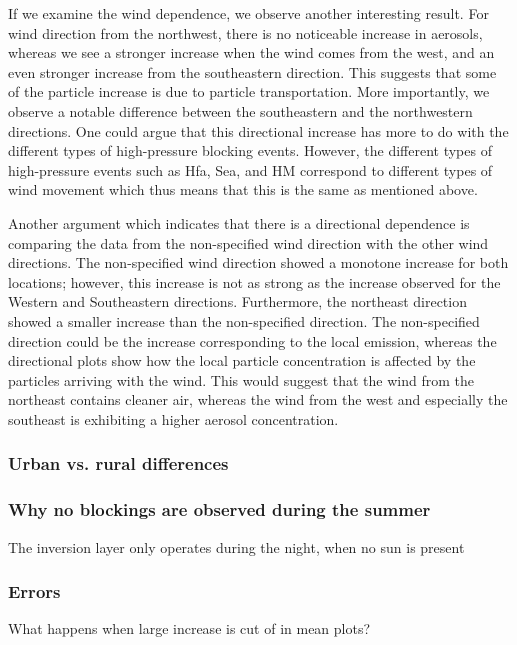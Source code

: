 If we examine the wind dependence, we observe another interesting result. For wind direction from the northwest, there is no noticeable increase in aerosols, whereas we see a stronger increase when the wind comes from the west, and an even stronger increase from the southeastern direction. This suggests that some of the particle increase is due to particle transportation. More importantly, we observe a notable difference between the southeastern and the northwestern directions. One could argue that this directional increase has more to do with the different types of high-pressure blocking events. However, the different types of high-pressure events such as Hfa, Sea, and HM correspond to different types of wind movement which thus means that this is the same as mentioned above. 

Another argument which indicates that there is a directional dependence is comparing the data from the non-specified wind direction with the other wind directions. The non-specified wind direction showed a monotone increase for both locations; however, this increase is not as strong as the increase observed for the Western and Southeastern directions. Furthermore, the northeast direction showed a smaller increase than the non-specified direction. The non-specified direction could be the increase corresponding to the local emission, whereas the directional plots show how the local particle concentration is affected by the particles arriving with the wind. This would suggest that the wind from the northeast contains cleaner air, whereas the wind from the west and especially the southeast is exhibiting a higher aerosol concentration.


\subsubsection{Urban vs. rural differences}

\subsubsection{Why no blockings are observed during the summer}
The inversion layer only operates during the night, when no sun is present



\subsubsection{Errors}
What happens when large increase is cut of in mean plots? 






